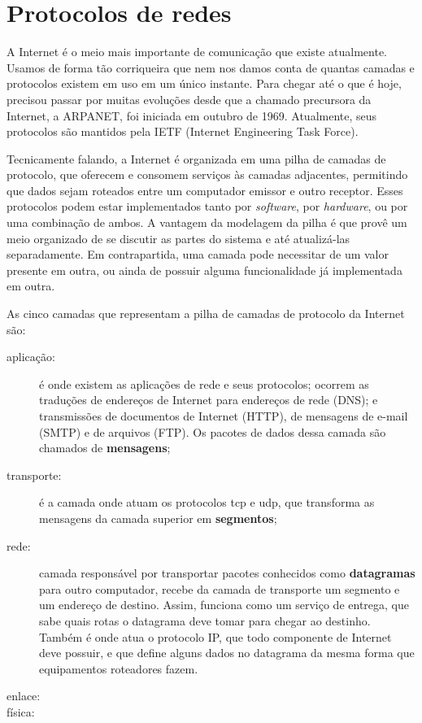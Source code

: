 
\section{Protocolos de redes}

A Internet é o meio mais importante de comunicação que existe atualmente. Usamos de
forma tão corriqueira que nem nos damos conta de quantas camadas e protocolos existem em
uso em um único instante. Para chegar até o que é hoje, precisou passar por muitas
evoluções desde que a chamado precursora da Internet, a ARPANET, foi iniciada em outubro
de 1969. Atualmente, seus protocolos são mantidos pela IETF (Internet Engineering Task
Force).

Tecnicamente falando, a Internet é organizada em uma pilha de camadas de protocolo, que
oferecem e consomem serviços às camadas adjacentes, permitindo que dados sejam roteados
entre um computador emissor e outro receptor. Esses protocolos podem estar implementados
tanto por \emph{software}, por \emph{hardware}, ou por uma combinação de ambos. A
vantagem da modelagem da pilha é que provê um meio organizado de se discutir as partes
do sistema e até atualizá-las separadamente. Em contrapartida, uma camada pode
necessitar de um valor presente em outra, ou ainda de possuir alguma funcionalidade já
implementada em outra.

As cinco camadas que representam a pilha de camadas de protocolo da Internet são:

\begin{description}
    \item[aplicação:] é onde existem as aplicações de rede e seus protocolos; ocorrem
        as traduções de endereços de Internet para endereços de rede (DNS); e
        transmissões de documentos de Internet (HTTP), de mensagens de e-mail (SMTP) e
        de arquivos (FTP). Os pacotes de dados dessa camada são chamados de
        \textbf{mensagens};

    \item[transporte:] é a camada onde atuam os protocolos \gls{tcp} e \gls{udp}, que
        transforma as mensagens da camada superior em \textbf{segmentos};

    \item[rede:] camada responsável por transportar pacotes conhecidos como
        \textbf{datagramas} para outro computador, recebe da camada de transporte um
        segmento e um endereço de destino. Assim, funciona como um serviço de entrega,
        que sabe quais rotas o datagrama deve tomar para chegar ao destinho. Também é
        onde atua o protocolo IP, que todo componente de Internet deve possuir, e que
        define alguns dados no datagrama da mesma forma que equipamentos roteadores
        fazem.

    \item[enlace:]

    \item[física:]
\end{description}

